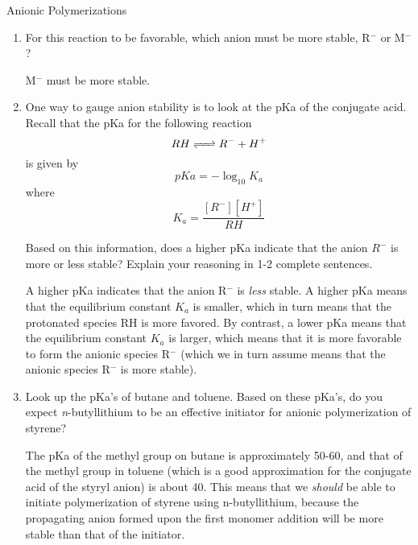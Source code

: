 \begin{activity}{Anionic Polymerizations}
\begin{exercises}
		\begin{enumerate}
			\item For this reaction to be favorable, which anion must be more stable, R$^-$ or M$^-$?
			
				\begin{solution}{}
					M$^-$ must be more stable.
				\end{solution}
				
			\item One way to gauge anion stability is to look at the pKa of the conjugate acid.  Recall that the pKa for the following reaction
					\begin{equation*}
						RH \ce{<=>} R^- + H^+
					\end{equation*}
				is given by 
					\begin{equation*}
						pKa = -\log_{10} K_a
					\end{equation*}
				where
					\begin{equation*}
						K_a = \frac{[R^-][H^+]}{RH}
					\end{equation*}
					
					Based on this information, does a higher pKa indicate that the anion $R^-$ is more or less stable?  Explain your reasoning in 1-2 complete sentences.
					
				\begin{solution}{}
					A higher pKa indicates that the anion R$^-$ is \emph{less} stable.  A higher pKa means that the equilibrium constant $K_a$ is smaller, which in turn means that the protonated species RH is more favored.  By contrast, a lower pKa means that the equilibrium constant $K_a$ is larger, which means that it is more favorable to form the anionic species R$^-$ (which we in turn assume means that the anionic species R$^-$ is more stable).
				\end{solution}
				
			\item Look up the pKa's of butane and toluene.  Based on these pKa's, do you expect \emph{n}-butyllithium to be an effective initiator for anionic polymerization of styrene?
			
				\begin{solution}{}
					The pKa of the methyl group on butane is approximately 50-60, and that of the methyl group in toluene (which is a good approximation for the conjugate acid of the styryl anion) is about 40.  This means that we \emph{should} be able to initiate polymerization of styrene using n-butyllithium, because the propagating anion formed upon the first monomer addition will be more stable than that of the initiator.
				\end{solution}
				

\end{enumerate}
\end{exercises}
\end{activity}
